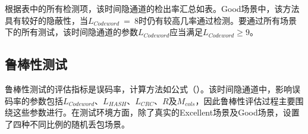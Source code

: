 
根据表中的所有检测项，该时间隐通道的检出率汇总如表。Good场景中，该方法具有较好的隐蔽性，当$L_{Codeword}\ =\ 8$时仍有较高几率通过检测。要通过所有场景下的所有测试，该时间隐通道的参数$L_{Codeword}$应当满足$L_{Codeword}\ge 9$。

\subsection{鲁棒性测试}
\label{chap:hash:result:robustness}

鲁棒性测试的评估指标是误码率，计算方法如公式（）。该时间隐通道中，影响误码率的参数包括$L_{Codeword}$、$L_{HASH}$、$L_{CRC}$、$R$及$M_{cols}$，因此鲁棒性评估过程主要围绕这些参数进行。在测试环境方面，除了真实的Excellent场景及Good场景，设置了四种不同比例的随机丢包场景。

